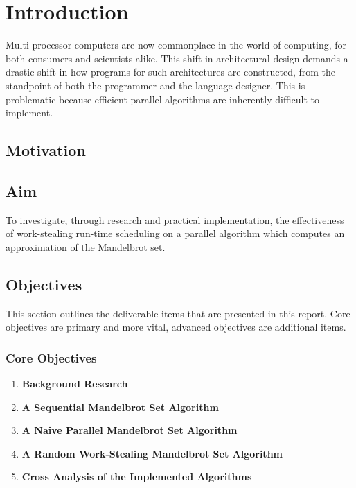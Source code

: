 \chapter{Introduction}


Multi-processor computers are now commonplace in the world of computing, for both consumers and scientists alike. 
This shift in architectural design demands a drastic shift in how programs for such architectures are constructed, 
from the standpoint of both the programmer and the language designer. 
This is problematic because efficient parallel algorithms are inherently difficult to implement.


\section*{Motivation}


\section*{Aim}

To investigate, through research and practical implementation, the effectiveness of work-stealing run-time scheduling on
a parallel algorithm which computes an approximation of the Mandelbrot set.

\section*{Objectives}
This section outlines the deliverable items that are presented in this report.
Core objectives are primary and more vital, advanced objectives are additional items.

\subsection*{Core Objectives}
\begin{enumerate}
\item \textbf{Background Research}
\item \textbf{A Sequential Mandelbrot Set Algorithm}
\item \textbf{A Naive Parallel Mandelbrot Set Algorithm}
\item \textbf{A Random Work-Stealing Mandelbrot Set Algorithm}
\item \textbf{Cross Analysis of the Implemented Algorithms}
\setcounter{saveenum}{\value{enumi}}
\end{enumerate}

